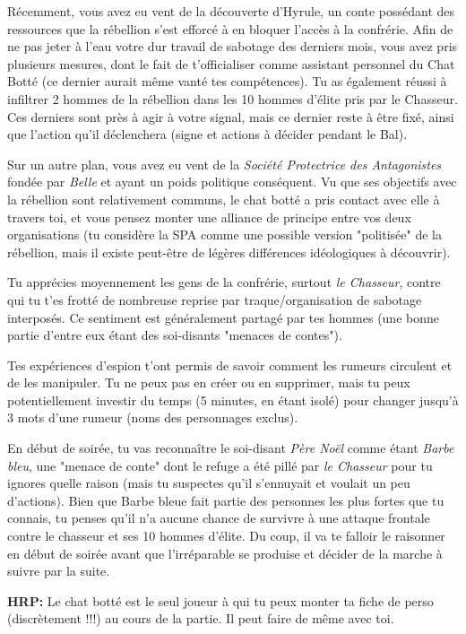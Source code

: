 {	\par Récemment, vous avez eu vent de la découverte d'Hyrule, un conte possédant des ressources que la rébellion s'est efforcé à en bloquer l'accès à la confrérie. Afin de ne pas jeter à l'eau votre dur travail de sabotage des derniers mois, vous avez pris plusieurs mesures, dont le fait de t'officialiser comme assistant personnel du Chat Botté (ce dernier aurait même vanté tes compétences). Tu as également réussi à infiltrer 2 hommes de la rébellion dans les 10 hommes d'élite pris par le Chasseur. Ces derniers sont près à agir à votre signal, mais ce dernier reste à être fixé, ainsi que l'action qu'il déclenchera (signe et actions à décider pendant le Bal).
	
	\par Sur un autre plan, vous avez eu vent de la \emph{Société Protectrice des Antagonistes} fondée par \emph{Belle} et ayant un poids politique conséquent. Vu que ses objectifs avec la rébellion sont relativement communs, le chat botté a pris contact avec elle à travers toi, et vous pensez monter une alliance de principe entre vos deux organisations (tu considère la SPA comme une possible version "politisée" de la rébellion, mais il existe peut-être de légères différences idéologiques à découvrir).
	
	\par Tu apprécies moyennement les gens de la confrérie, surtout \emph{le Chasseur}, contre qui tu t'es frotté de nombreuse reprise par traque/organisation de sabotage interposés. Ce sentiment est généralement partagé par tes hommes (une bonne partie d'entre eux étant des soi-disants "menaces de contes").
	
	\par Tes expériences d'espion t'ont permis de savoir comment les rumeurs circulent et de les manipuler. Tu ne peux pas en créer ou en supprimer, mais tu peux potentiellement investir du temps (5 minutes, en étant isolé) pour changer jusqu'à 3 mots d'une rumeur (noms des personnages exclus).
	
	\par En début de soirée, tu vas reconnaître le soi-disant \emph{Père Noël} comme étant \emph{Barbe bleu}, une "menace de conte" dont le refuge a été pillé par \emph{le Chasseur} pour tu ignores quelle raison (mais tu suspectes qu'il s'ennuyait et voulait un peu d'actions). Bien que Barbe bleue fait partie des personnes les plus fortes que tu connais, tu penses qu'il n'a aucune chance de survivre à une attaque frontale contre le chasseur et ses 10 hommes d'élite. Du coup, il va te falloir le raisonner en début de soirée avant que l'irréparable se produise et décider de la marche à suivre par la suite.
	
	\par \textbf{HRP:} Le chat botté est le seul joueur à qui tu peux monter ta fiche de perso (discrètement !!!) au cours de la partie. Il peut faire de même avec toi.
}



